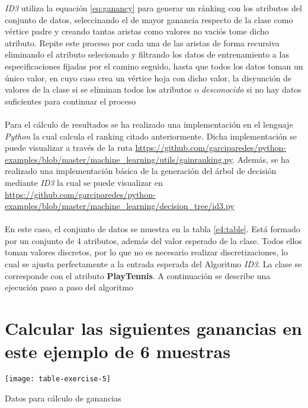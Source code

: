 \documentclass[10pt, a4paper,spanish]{article}
\begin{document}
		\begin{algorithm}
			\emph{ID3} utiliza la equación \eqref{eq:ganancy} para generar un ránking con los atributos del conjunto de datos, seleccinando el de mayor ganancia respecto de la clase como vértice padre y creando tantas aristas como valores no vaciós tome dicho atributo. Repite este proceso por cada una de las aristas de forma recursiva eliminando el atributo selecionado y filtrando los datos de entrenamiento a las especificaciones fijadas por el camino seguido, hasta que todos los datos toman un único valor, en cuyo caso crea un vértice hoja con dicho valor, la disyunción de valores de la clase si se eliminan todos los atributos o \emph{desconocido} si no hay datos suficientes para continuar el proceso
		\end{algorithm}

		\paragraph{}
		Para el cálculo de resultados se ha realizado una implementación en el lenguaje \emph{Python} la cual calcula el ranking citado anteriormente. Dicha implementación se puede visualizar a través de la ruta \url{https://github.com/garciparedes/python-examples/blob/master/machine_learning/utils/gainranking.py}. Además, se ha realizado una implementación básica de la generación del árbol de decisión mediante \emph{ID3} la cual se puede visualizar en \url{https://github.com/garciparedes/python-examples/blob/master/machine_learning/decision_tree/id3.py}


		\paragraph{}
		En este caso, el conjunto de datos se muestra en la tabla \ref{e4:table}. Está formado por un conjunto de 4 atributos, además del valor esperado de la clase. Todos ellos toman valores discretos, por lo que no es necesario realizar discretizaciones, lo cual se ajusta perfectamente a la entrada esperada del Algoritmo \emph{ID3}. La clase se corresponde con el atributo \textbf{PlayTennis}. A continuación se describe una ejecución paso a paso del algoritmo

	\section{Calcular las siguientes ganancias en este ejemplo de 6 muestras}

		\begin{table}
			\begin{center}
				\texttt{[image: table-exercise-5]}
				\caption{Datos para cálculo de ganancias}
			\end{center}
			\label{e5:table}
		\end{table}
\end{document}
